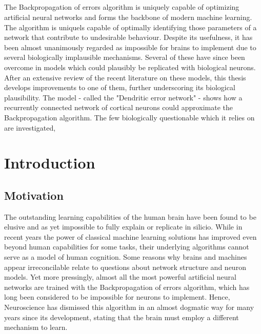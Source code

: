 
\begin{center}
  
  \chapter*{}

  The Backpropagation of errors algorithm is uniquely capable of optimizing artificial neural networks and forms the
  backbone of modern machine learning. The algorithm is uniquels capable of optimally identifying those parameters of a
  network that contribute to undesirable behaviour. Despite its usefulness, it has been almost unanimously regarded as
  impossible for brains to implement due to several biologically implausible mechanisms. Several of these have since
  been overcome in models which could plausibly be replicated with biological neurons. After an extensive review of the
  recent literature on these models, this thesis develops improvements to one of them, further underscoring its
  biological plausibility. The model - called the "Dendritic error network" - shows how a recurrently connected network
  of cortical neurons could approximate the Backpropagation algorithm. The few biologically questionable which it relies
  on are investigated,  
  
\end{center}

\chapter{Introduction}



\section{Motivation}

The outstanding learning capabilities of the human brain have been found to be elusive and as yet impossible to fully
explain or replicate in silicio. While in recent years the power of classical machine learning solutions  has improved
even beyond human capabilities for some tasks, their underlying algorithms cannot serve as a model of human cognition.
Some reasons why brains and machines appear irreconcilable relate to questions about network structure and neuron
models. Yet more pressingly, almost all the most powerful artificial neural networks are trained with the
Backpropagation of errors algorithm, which has long been considered to be impossible for neurons to implement. Hence,
Neuroscience has dismissed this algorithm in an almost dogmatic way for many years since its development, stating that
the brain must employ a different mechanism to learn.


